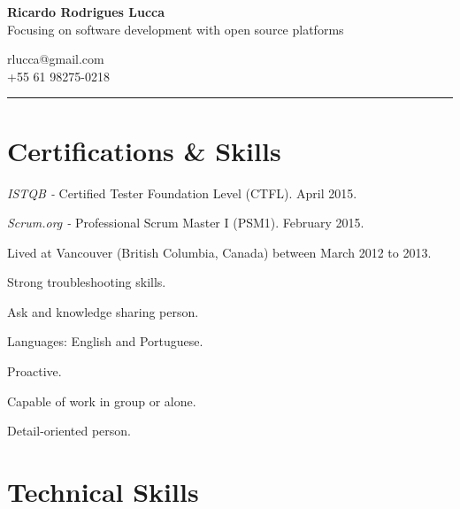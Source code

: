 \documentclass[12pt,oneside,a4paper]{article}
\newcommand{\makeheading}[3] {
  \begin{minipage}[t]{\textwidth}
    \begin{minipage}[t]{0.75\textwidth}
        {\Huge\bfseries{#1}} \\
        Focusing on software development with open source platforms
     \end{minipage}%
     \begin{minipage}[t]{0.25\textwidth}
            #2 \\ #3
     \end{minipage}
     \rule{\columnwidth}{1pt}
  \end{minipage}
}
\begin{document}
\addtolength{\oddsidemargin}{0.5cm}
\addtolength{\evensidemargin}{1.0cm}
\addtolength{\textwidth}{-1.5cm}

\makeheading{Ricardo Rodrigues Lucca}{rlucca@gmail.com}{+55 61 98275-0218}

\newlength{\rcollength}\setlength{\rcollength}{1.85in}%

\section*{Certifications \& Skills}

\begin{compactitem}
	\item \textit{ISTQB - } Certified Tester Foundation Level (CTFL). April 2015.
	\item \textit{Scrum.org - } Professional Scrum Master I (PSM1). February 2015.
  \item Lived at Vancouver (British Columbia, Canada) between March 2012 to 2013.\\
  \begin{minipage}{0.5\textwidth}
	\item Strong troubleshooting skills.
  \item Ask and knowledge sharing person.
  \item Languages: English and Portuguese.
  \end{minipage}
  \begin{minipage}{0.5\textwidth}
	\item Proactive.
  \item Capable of work in group or alone.
	\item Detail-oriented person.
  \end{minipage}
\end{compactitem}

\section*{Technical Skills}
\end{document}
